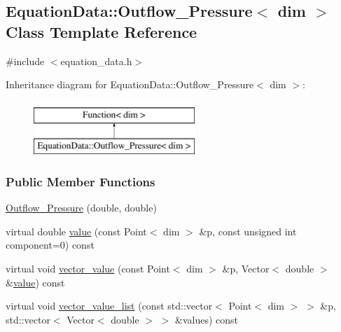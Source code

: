 \hypertarget{class_equation_data_1_1_outflow___pressure}{}\subsection{Equation\+Data\+:\+:Outflow\+\_\+\+Pressure$<$ dim $>$ Class Template Reference}
\label{class_equation_data_1_1_outflow___pressure}


{\ttfamily \#include $<$equation\+\_\+data.\+h$>$}

Inheritance diagram for Equation\+Data\+:\+:Outflow\+\_\+\+Pressure$<$ dim $>$\+:\begin{figure}[H]
\begin{center}
\leavevmode
\includegraphics[height=2.000000cm]{class_equation_data_1_1_outflow___pressure}
\end{center}
\end{figure}
\subsubsection*{Public Member Functions}
\begin{DoxyCompactItemize}
\item 
\hyperlink{class_equation_data_1_1_outflow___pressure_a39cac043cd06378017efd9f9dfc2d40b}{Outflow\+\_\+\+Pressure} (double, double)
\item 
virtual double \hyperlink{class_equation_data_1_1_outflow___pressure_a48baf3b5f5a0b2ae4cdefeb62b429ca6}{value} (const Point$<$ dim $>$ \&p, const unsigned int component=0) const 
\item 
virtual void \hyperlink{class_equation_data_1_1_outflow___pressure_a430252223a17d71b8e10f76fb4bce313}{vector\+\_\+value} (const Point$<$ dim $>$ \&p, Vector$<$ double $>$ \&\hyperlink{class_equation_data_1_1_outflow___pressure_a48baf3b5f5a0b2ae4cdefeb62b429ca6}{value}) const 
\item 
virtual void \hyperlink{class_equation_data_1_1_outflow___pressure_a31c63da8138ec9837790878952008ba9}{vector\+\_\+value\+\_\+list} (const std\+::vector$<$ Point$<$ dim $>$ $>$ \&p, std\+::vector$<$ Vector$<$ double $>$ $>$ \&values) const 
\end{DoxyCompactItemize}

